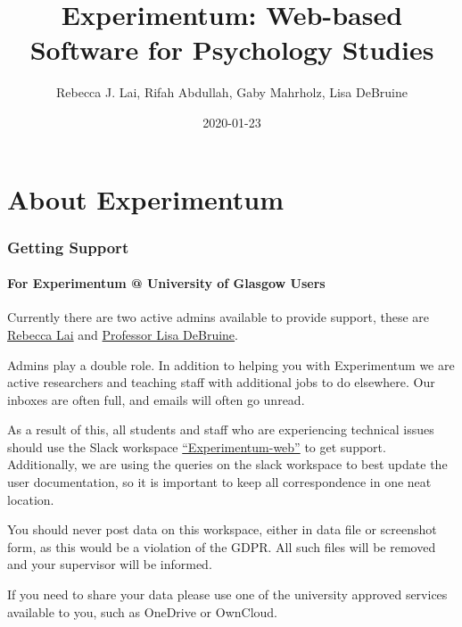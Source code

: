 \documentclass[]{book}
\title{Experimentum: Web-based Software for Psychology Studies}
\author{Rebecca J. Lai, Rifah Abdullah, Gaby Mahrholz, Lisa DeBruine}
\date{2020-01-23}
\begin{document}
\maketitle

{
\setcounter{tocdepth}{1}
\tableofcontents
}
\hypertarget{about-experimentum}{%
\chapter*{About Experimentum}\label{about-experimentum}}

\hypertarget{support}{%
\subsection*{Getting Support}\label{support}}

\hypertarget{for-experimentum-university-of-glasgow-users}{%
\subsubsection*{For Experimentum @ University of Glasgow Users}\label{for-experimentum-university-of-glasgow-users}}

Currently there are two active admins available to provide support, these are \href{mailto:rebecca.lai@glasgow.ac.uk}{Rebecca Lai} and \href{mailto:lisa.debruine@glasgow.ac.uk}{Professor Lisa DeBruine}.

Admins play a double role. In addition to helping you with Experimentum we are active researchers and teaching staff with additional jobs to do elsewhere. Our inboxes are often full, and emails will often go unread.

As a result of this, all students and staff who are experiencing technical issues should use the Slack workspace \href{https://experimentum-web.slack.com/}{``Experimentum-web''} to get support. Additionally, we are using the queries on the slack workspace to best update the user documentation, so it is important to keep all correspondence in one neat location.

\begin{rainbow}
You should never post data on this workspace, either in data file or
screenshot form, as this would be a violation of the GDPR. All such
files will be removed and your supervisor will be informed.

If you need to share your data please use one of the university approved
services available to you, such as OneDrive or OwnCloud.
\end{rainbow}
\end{document}
